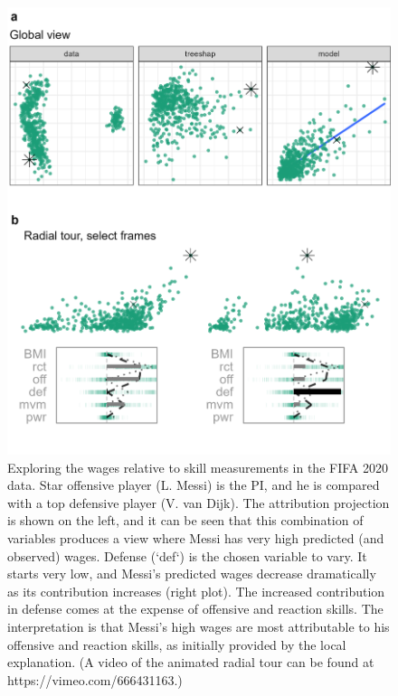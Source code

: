 \documentclass[
]{jss}
\begin{document}
\begin{CodeChunk}
\begin{figure}

{\centering \includegraphics[width=0.9\linewidth]{./figures/case_fifa} 

}

\caption[Exploring the wages relative to skill measurements in the FIFA 2020 data]{Exploring the wages relative to skill measurements in the FIFA 2020 data. Star offensive player (L. Messi) is the PI, and he is compared with a top defensive player (V. van Dijk). The attribution projection is shown on the left, and it can be seen that this combination of variables produces a view where Messi has very high predicted (and observed) wages. Defense (`def`) is the chosen variable to vary. It starts very low, and Messi's predicted wages decrease dramatically as its contribution increases (right plot). The increased contribution in defense comes at the expense of offensive and reaction skills. The interpretation is that Messi's high wages are most attributable to his offensive and reaction skills, as initially provided by the local explanation. (A video of the animated radial tour can be found at https://vimeo.com/666431163.)}\label{fig:casefifa}
\end{figure}
\end{CodeChunk}
\end{document}
